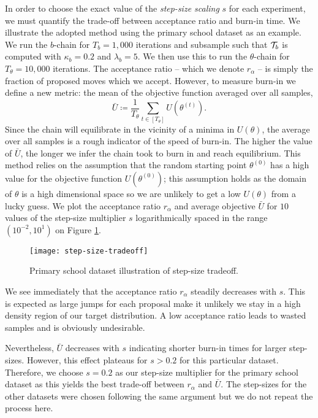 In order to choose the exact value of the {\em step-size scaling} $s$ for each experiment, we must quantify the trade-off between acceptance ratio and burn-in time. We illustrate the adopted method using the primary school dataset \cite{schools} as an example. We run the $b$-chain for $T_b = 1,000$ iterations and subsample such that $\mathcal{T}_b$ is computed with $\kappa_b=0.2$ and $\lambda_b=5$. We then use this to run the $\theta$-chain for $T_\theta = 10,000$ iterations. The acceptance ratio -- which we denote $r_\alpha$ -- is simply the fraction of proposed moves which we accept. However, to measure burn-in we define a new metric: the mean of the objective function averaged over all samples,
%
\begin{equation}
	\bar{U} \coloneqq \frac{1}{T_\theta} \sum_{t \in [T_\theta]} U\left( \theta^{(t)} \right).
\end{equation}
%
Since the chain will equilibrate in the vicinity of a minima in $U(\theta)$, the average over all samples is a rough indicator of the speed of burn-in. The higher the value of $\bar{U}$, the longer we infer the chain took to burn in and reach equilibrium. This method relies on the assumption that the random starting point $\theta^{(0)}$ has a high value for the objective function $U(\theta^{(0)})$; this assumption holds as the domain of $\theta$ is a high dimensional space so we are unlikely to get a low $U(\theta)$ from a lucky guess. We plot the acceptance ratio $r_\alpha$ and average objective $\bar{U}$ for $10$ values of the step-size multiplier $s$ logarithmically spaced in the range $(10^{-2}, 10^1)$ on Figure \ref{fig:step-size-tradeoff}.
%
\begin{figure}[!h]
	\centering
	\texttt{[image: step-size-tradeoff]}
	\caption{Primary school dataset illustration of step-size tradeoff.}
	\label{fig:step-size-tradeoff}
\end{figure}

We see immediately that the acceptance ratio $r_\alpha$ steadily decreases with $s$. This is expected as large jumps for each proposal make it unlikely we stay in a high density region of our target distribution. A low acceptance ratio leads to wasted samples and is obviously undesirable.

Nevertheless, $\bar{U}$ decreases with $s$ indicating shorter burn-in times for larger step-sizes. However, this effect plateaus for $s>0.2$ for this particular dataset. Therefore, we choose $s=0.2$ as our step-size multiplier for the primary school dataset as this yields the best trade-off between $r_\alpha$ and $\bar{U}$. The step-sizes for the other datasets were chosen following the same argument but we do not repeat the process here.

